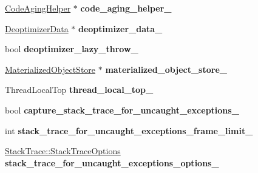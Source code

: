 \begin{DoxyCompactItemize}
\item 
\hyperlink{classv8_1_1internal_1_1_code_aging_helper}{Code\+Aging\+Helper} $\ast$ {\bfseries code\+\_\+aging\+\_\+helper\+\_\+}\hypertarget{classv8_1_1internal_1_1_isolate_a7f14423963dc0045bc9a813e373158b6}{}\label{classv8_1_1internal_1_1_isolate_a7f14423963dc0045bc9a813e373158b6}

\item 
\hyperlink{classv8_1_1internal_1_1_deoptimizer_data}{Deoptimizer\+Data} $\ast$ {\bfseries deoptimizer\+\_\+data\+\_\+}\hypertarget{classv8_1_1internal_1_1_isolate_acd451d09ac1586523fe9f06c209f90cb}{}\label{classv8_1_1internal_1_1_isolate_acd451d09ac1586523fe9f06c209f90cb}

\item 
bool {\bfseries deoptimizer\+\_\+lazy\+\_\+throw\+\_\+}\hypertarget{classv8_1_1internal_1_1_isolate_a05654294f67c2e32b2fc2efbc7c08e24}{}\label{classv8_1_1internal_1_1_isolate_a05654294f67c2e32b2fc2efbc7c08e24}

\item 
\hyperlink{classv8_1_1internal_1_1_materialized_object_store}{Materialized\+Object\+Store} $\ast$ {\bfseries materialized\+\_\+object\+\_\+store\+\_\+}\hypertarget{classv8_1_1internal_1_1_isolate_ad4e5c30f3a96e91070e8268140dbadfa}{}\label{classv8_1_1internal_1_1_isolate_ad4e5c30f3a96e91070e8268140dbadfa}

\item 
Thread\+Local\+Top {\bfseries thread\+\_\+local\+\_\+top\+\_\+}\hypertarget{classv8_1_1internal_1_1_isolate_ad3e44f34631180ec1642d1f02a820463}{}\label{classv8_1_1internal_1_1_isolate_ad3e44f34631180ec1642d1f02a820463}

\item 
bool {\bfseries capture\+\_\+stack\+\_\+trace\+\_\+for\+\_\+uncaught\+\_\+exceptions\+\_\+}\hypertarget{classv8_1_1internal_1_1_isolate_aeb333d78b7608509acceb1c4efa91c12}{}\label{classv8_1_1internal_1_1_isolate_aeb333d78b7608509acceb1c4efa91c12}

\item 
int {\bfseries stack\+\_\+trace\+\_\+for\+\_\+uncaught\+\_\+exceptions\+\_\+frame\+\_\+limit\+\_\+}\hypertarget{classv8_1_1internal_1_1_isolate_a02c1e9336cf4517757e14e7c656fa8e0}{}\label{classv8_1_1internal_1_1_isolate_a02c1e9336cf4517757e14e7c656fa8e0}

\item 
\hyperlink{classv8_1_1_stack_trace_a9704e4a37949eb8eb8ccddbddf161492}{Stack\+Trace\+::\+Stack\+Trace\+Options} {\bfseries stack\+\_\+trace\+\_\+for\+\_\+uncaught\+\_\+exceptions\+\_\+options\+\_\+}\hypertarget{classv8_1_1internal_1_1_isolate_aafbd78cbc6c5076d746c707051a918f5}{}\label{classv8_1_1internal_1_1_isolate_aafbd78cbc6c5076d746c707051a918f5}


\end{DoxyCompactItemize}
